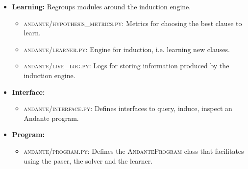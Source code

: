 \documentclass{article}
\begin{document}
\begin{itemize}
    \item \textbf{Learning:} Regroups modules around the induction engine.
    \begin{itemize}
        \item \textsc{andante/hypothesis\_metrics.py}: Metrics for choosing the best
            clause to learn.
        \item \textsc{andante/learner.py}: Engine for induction, i.e. learning new
            clauses.
        \item \textsc{andante/live\_log.py}: Logs for storing information produced by
            the induction engine.
    \end{itemize}
    
    \item \textbf{Interface:}
    \begin{itemize}
        \item \textsc{andante/interface.py}: Defines interfaces to query, induce,
            inspect an Andante program.
    \end{itemize}
    
    \item \textbf{Program:}
    \begin{itemize}
        \item \textsc{andante/program.py}: Defines the \textsc{AndanteProgram} class
            that facilitates using the paser, the solver and the learner.
    \end{itemize}
    
\end{itemize}




\end{document}
